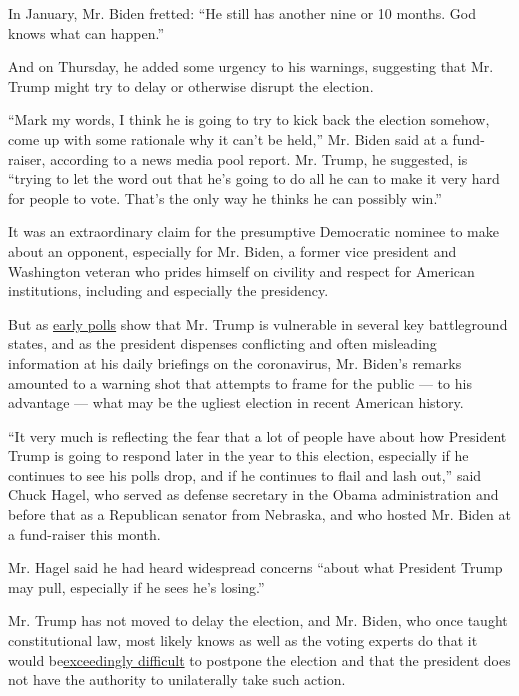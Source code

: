 In January, Mr. Biden fretted: ``He still has another nine or 10 months.
God knows what can happen.''

And on Thursday, he added some urgency to his warnings, suggesting that
Mr. Trump might try to delay or otherwise disrupt the election.

``Mark my words, I think he is going to try to kick back the election
somehow, come up with some rationale why it can't be held,'' Mr. Biden
said at a fund-raiser, according to a news media pool report. Mr. Trump,
he suggested, is ``trying to let the word out that he's going to do all
he can to make it very hard for people to vote. That's the only way he
thinks he can possibly win.''

It was an extraordinary claim for the presumptive Democratic nominee to
make about an opponent, especially for Mr. Biden, a former vice
president and Washington veteran who prides himself on civility and
respect for American institutions, including and especially the
presidency.

But as
\href{https://www.nytimes3xbfgragh.onion/2020/04/24/us/politics/biden-trump-swing-state-polls.html}{early
polls} show that Mr. Trump is vulnerable in several key battleground
states, and as the president dispenses conflicting and often misleading
information at his daily briefings on the coronavirus, Mr. Biden's
remarks amounted to a warning shot that attempts to frame for the public
--- to his advantage --- what may be the ugliest election in recent
American history.

``It very much is reflecting the fear that a lot of people have about
how President Trump is going to respond later in the year to this
election, especially if he continues to see his polls drop, and if he
continues to flail and lash out,'' said Chuck Hagel, who served as
defense secretary in the Obama administration and before that as a
Republican senator from Nebraska, and who hosted Mr. Biden at a
fund-raiser this month.

Mr. Hagel said he had heard widespread concerns ``about what President
Trump may pull, especially if he sees he's losing.''

Mr. Trump has not moved to delay the election, and Mr. Biden, who once
taught constitutional law, most likely knows as well as the voting
experts do that it would
be\href{https://www.nytimes3xbfgragh.onion/2020/03/14/us/politics/election-postponed-canceled.html}{exceedingly
difficult} to postpone the election and that the president does not have
the authority to unilaterally take such action.

